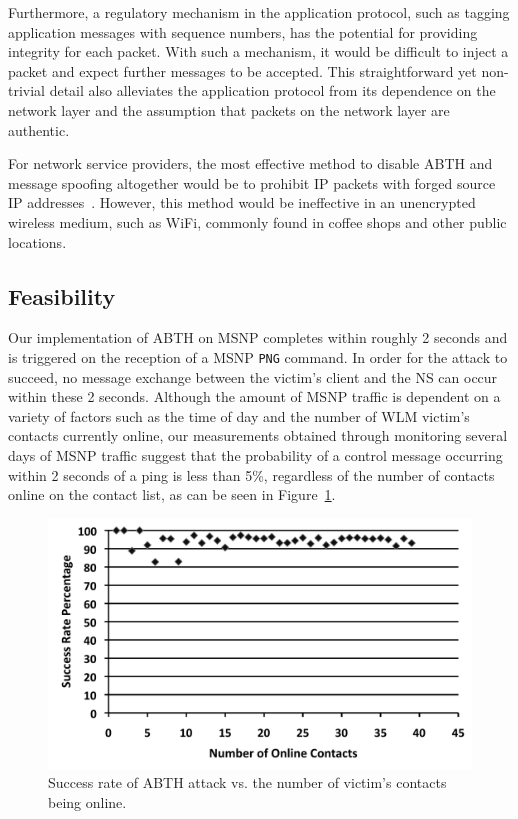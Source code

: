 \documentclass{sig-alternate}
\begin{document}
Furthermore, a regulatory mechanism in the application protocol, such as tagging application messages with sequence numbers, has the potential for providing integrity for each packet.
With such a mechanism, it would be difficult to inject a packet and expect further messages to be accepted.
This straightforward yet non-trivial detail also alleviates the application protocol from its dependence on the network layer and the assumption that packets on the network layer are authentic.

For network service providers, the most effective method to disable ABTH and message spoofing altogether would be to prohibit IP packets with forged source IP addresses~\cite{templeton:spoof}.
However, this method would be ineffective in an unencrypted wireless medium, such as WiFi, commonly found in coffee shops and other public locations. 

\vfil\eject

\subsection{Feasibility}
\label{sec:feasibility}

Our implementation of ABTH on MSNP completes within roughly 2 seconds and is triggered on the reception of a MSNP \texttt{PNG} command.
In order for the attack to succeed, no message exchange between the victim's client and the NS can occur within these 2 seconds.
Although the amount of MSNP traffic is dependent on a variety of factors such as the time of day and the number of WLM victim's contacts currently online, our measurements obtained through monitoring several days of MSNP traffic suggest that the probability of a control message occurring within 2 seconds of a ping is less than 5\%, regardless of the number of contacts online on the contact list, as can be seen in Figure~\ref{fig:successrate}.

\begin{figure}[h]
	\centering
	\caption{Success rate of ABTH attack vs. the number of victim's contacts being online.}
	\label{fig:successrate}
	\includegraphics[width=\columnwidth]{graphics/plot}
\end{figure}
\end{document}
